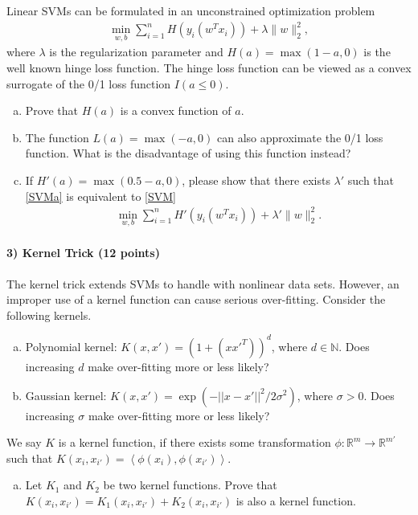 \documentclass[11pt]{article}
\begin{document}
Linear SVMs can be formulated in an unconstrained optimization problem
\begin{align}\label{SVM}
\min_{w,b}\sum_{i=1}^n H(y_i(w^Tx_i)) + \lambda\|w\|_2^2,
\end{align}
where $\lambda$ is the regularization parameter and $H(a) = \max(1-a,0)$ is the well known hinge loss function. The hinge loss function can be viewed as a convex surrogate of the 0/1 loss function $I(a \leq 0)$.
\begin{enumerate}[(a)]
\item Prove that $H(a)$ is a convex function of $a$.
\item The function $L(a) = \max(-a,0)$ can also approximate the 0/1 loss function. What is the disadvantage of using this function instead?
\item If $H'(a) = \max(0.5-a,0)$, please show that there exists $\lambda'$ such that \eqref{SVMa} is equivalent to \eqref{SVM}
\begin{align}\label{SVMa}
\min_{w,b}\sum_{i=1}^n H'(y_i(w^Tx_i)) + \lambda'\|w\|_2^2.
\end{align}
\end{enumerate}

\paragraph{3) Kernel Trick (12 points)}
The kernel trick extends SVMs to handle with nonlinear data sets. However, an improper use of a kernel function can cause serious over-fitting. Consider the following kernels.
\begin{enumerate}[(a)]
\item Polynomial kernel: $K(x, x') = (1 + (x x'^T))^d$, where  $d\in\mathbb{N}$. Does increasing $d$ make over-fitting more or less likely?
\item Gaussian kernel: $K(x, x') = \exp(-|| x-x'||^2 / 2 \sigma^2)$, where $\sigma>0$. Does increasing $\sigma$ make over-fitting more or less likely?
\end{enumerate}
We say $K$ is a kernel function, if there exists some transformation $\phi:\mathbb{R}^m\rightarrow \mathbb{R}^{m'}$ such that $K(x_i,x_{i'}) = \left<\phi(x_i),\phi(x_{i'})\right>$.
\begin{enumerate}[(c)]
\item Let $K_1$ and $K_2$ be two kernel functions. Prove that $K(x_i,x_{i'}) = K_1(x_i,x_{i'}) + K_2(x_i,x_{i'})$ is also a kernel function.
\end{enumerate}
\end{document}
